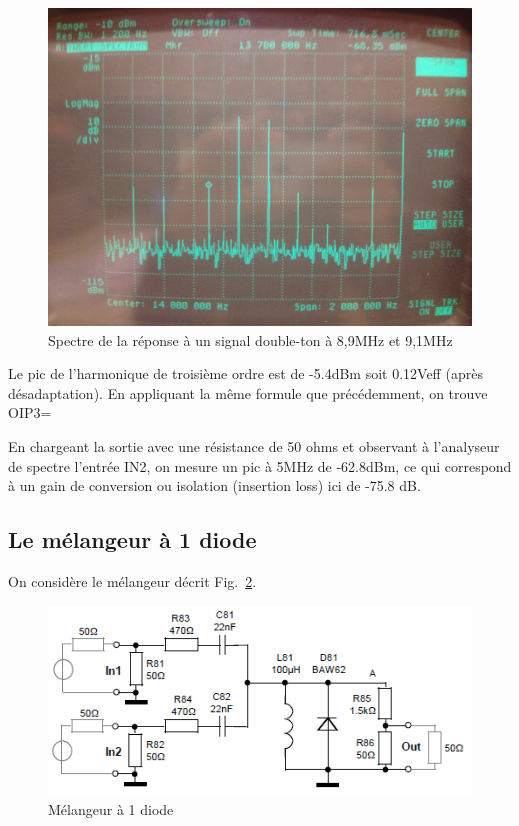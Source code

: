 \documentclass{article}
\begin{document}
\begin{figure}[h!]
	\centering
	\includegraphics[width=.7\textwidth]{10_3_4}
	\caption{Spectre de la réponse à un signal double-ton à 8,9MHz et 9,1MHz}
	\label{fig:10_3_4}
\end{figure}

Le pic de l'harmonique de troisième ordre est de -5.4dBm soit 0.12Veff (après désadaptation).
En appliquant la même formule que précédemment, on trouve OIP3=






En chargeant la sortie avec une résistance de 50 ohms et observant à l'analyseur de spectre l'entrée IN2, on mesure un pic à 5MHz de -62.8dBm, ce qui correspond à un gain de conversion ou isolation  (insertion loss) ici de -75.8 dB.


\subsection{Le mélangeur à 1 diode}

On considère le mélangeur décrit Fig.~\ref{fig:schema_melangeur_diode}.
\begin{figure}[h!]
	\centering
	\includegraphics[width=.7\textwidth]{schema_melangeur_diode}
	\caption{Mélangeur à 1 diode}
	\label{fig:schema_melangeur_diode}
\end{figure}
\end{document}
